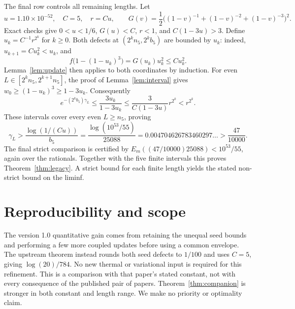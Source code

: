 \documentclass[11pt,a4paper]{article}
\newcommand{\gap}{\gamma}
\begin{document}
The final row controls all remaining lengths. Let
\[
 u=1.10\times10^{-52},\quad C=5,\quad r=Cu,\qquad
 G(v)=\frac12\bigl((1-v)^{-1}+(1-v)^{-2}+(1-v)^{-3}\bigr)^2.
\]
Exact checks give $0<u<1/6$, $G(u)<C$, $r<1$, and
$C(1-3u)>3$. Define $u_k=C^{-1}r^{2^k}$ for $k\ge0$.
Both defects at $(2^k n_5,2^k b_5)$ are bounded by $u_k$:
indeed, $u_{k+1}=Cu_k^2<u_k$, and
\[
 f\bigl(1-(1-u_k)^3\bigr)=G(u_k)u_k^2\le Cu_k^2.
\]
Lemma~\ref{lem:update} then applies to both coordinates by induction.
For even $L\in[2^k n_5,2^{k+1}n_5]$, the proof of
Lemma~\ref{lem:interval} gives $w_0\ge(1-u_k)^3\ge1-3u_k$.
Consequently
\[
 e^{-(2^k b_5)\gap_L}
 \le\frac{3u_k}{1-3u_k}
 \le\frac{3}{C(1-3u)}r^{2^k}<r^{2^k}.
\]
These intervals cover every even $L\ge n_5$, proving
\begin{equation}\label{eq:tail}
 \gap_L>\frac{\log(1/(Cu))}{b_5}
 =\frac{\log(10^{53}/55)}{25088}
 =0.004704626783460297\ldots>\frac{47}{10000}.
\end{equation}
The final strict comparison is certified by
$E_m((47/10000)25088)<10^{53}/55$, again over the rationals.
Together with the five finite intervals this proves
Theorem~\ref{thm:legacy}. A strict bound for each finite length yields
the stated non-strict bound on the liminf.

\section{Reproducibility and scope}
The version 1.0 quantitative gain comes from retaining the unequal seed bounds and
performing a few more coupled updates before using a common envelope.
The upstream theorem instead rounds both seed defects to $1/100$ and
uses $C=5$, giving $\log(20)/784$. No new thermal or variational input
is required for this refinement. This is a comparison with that paper's
stated constant, not with every consequence of the published pair of
papers. Theorem~\ref{thm:companion} is stronger in both constant and
length range. We make no priority or optimality claim.
\end{document}
